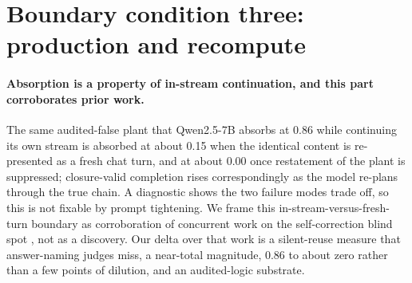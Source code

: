 \section{Boundary condition three: production and recompute}
\label{sec:production}


\paragraph{Absorption is a property of in-stream continuation, and this
part corroborates prior work.} The same audited-false plant that Qwen2.5-7B
absorbs at 0.86 while continuing its own stream is absorbed at about 0.15
when the identical content is re-presented as a fresh chat turn, and at
about 0.00 once restatement of the plant is suppressed; closure-valid
completion rises correspondingly as the model re-plans through the true
chain.
A diagnostic shows the two failure modes trade off, so this is not fixable
by prompt tightening. We frame this in-stream-versus-fresh-turn boundary as
corroboration of concurrent work on the self-correction blind spot
\citep{tsui2025blindspot, chen2026selfcorrection}, not as a discovery. Our
delta over that work is a silent-reuse measure that answer-naming judges
miss, a near-total magnitude, 0.86 to about zero rather than a few points of
dilution, and an audited-logic substrate.

